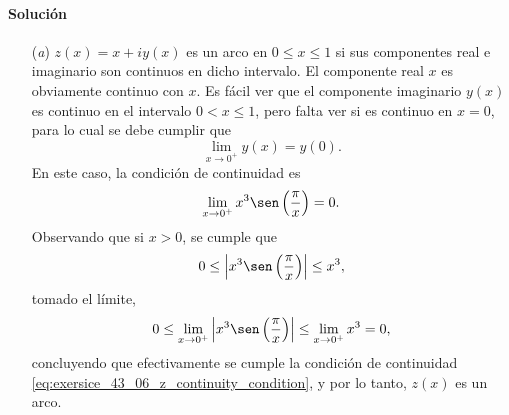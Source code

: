 \documentclass[a4paper]{report}
\begin{document}
\paragraph{Solución} 
\begin{enumerate}
 \item[(\textit{a})] \(z(x)=x+iy(x)\) es un arco en \(0\leq x\leq1\) si sus componentes real e imaginario son continuos en dicho intervalo. El componente real \(x\) es obviamente continuo con \(x\). Es fácil ver que el componente imaginario \(y(x)\) es continuo en el intervalo \(0<x\leq1\), pero falta ver si es continuo en \(x=0\), para lo cual se debe cumplir que 
\[
 \lim_{x\to0^+}y(x)=y(0).
\]
En este caso, la condición de continuidad es
\begin{equation}\label{eq:exersice_43_06_z_continuity_condition}
  \lim_{x\to0^+}x^3\sen\left(\frac{\pi}{x}\right)=0.
\end{equation}
Observando que si \(x>0\), se cumple que 
\[
 0\leq\left|x^3\sen\left(\frac{\pi}{x}\right)\right|\leq x^3,
\]
tomado el límite, 
\[
 0\leq\lim_{x\to0^+}\left|x^3\sen\left(\frac{\pi}{x}\right)\right|\leq\lim_{x\to0^+}x^3=0,
\]
concluyendo que efectivamente se cumple la condición de continuidad \ref{eq:exersice_43_06_z_continuity_condition}, y por lo tanto, \(z(x)\) es un arco.


\end{enumerate}
\end{document}
